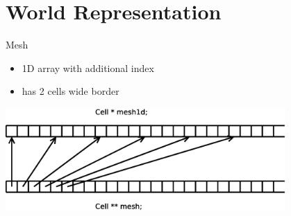 \documentclass{beamer}
\begin{document}
\section{World Representation}

\begin{frame}{Mesh}
    \begin{itemize}
        \item 1D array with additional index
        \item has 2 cells wide border
    \end{itemize}

    \begin{center}
        \includegraphics[width=0.8\textwidth]{mesh}
    \end{center}
\end{frame}
\end{document}
